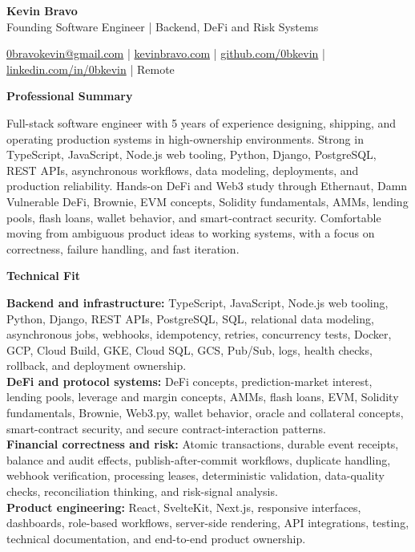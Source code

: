 \documentclass[10pt]{article}
\newcommand{\sectiontitle}[1]{%
    \vspace{3pt}
    \begin{center}
        \textbf{#1}
    \end{center}
    \vspace{-5pt}
}
\begin{document}
\raggedright

\begin{center}
    {\LARGE \textbf{Kevin Bravo}}\\
    Founding Software Engineer | Backend, DeFi and Risk Systems \\
    \hrulefill
\end{center}

\begin{center}
    \href{mailto:0bravokevin@gmail.com}{0bravokevin@gmail.com}
    | \href{https://kevinbravo.com}{kevinbravo.com}
    | \href{https://github.com/0bkevin}{github.com/0bkevin}
    | \href{https://www.linkedin.com/in/0bkevin/}{linkedin.com/in/0bkevin}
    | Remote
\end{center}

\fontsize{9.65}{10.55}\selectfont

\sectiontitle{Professional Summary}
Full-stack software engineer with 5 years of experience designing, shipping, and operating production systems in high-ownership environments. Strong in TypeScript, JavaScript, Node.js web tooling, Python, Django, PostgreSQL, REST APIs, asynchronous workflows, data modeling, deployments, and production reliability. Hands-on DeFi and Web3 study through Ethernaut, Damn Vulnerable DeFi, Brownie, EVM concepts, Solidity fundamentals, AMMs, lending pools, flash loans, wallet behavior, and smart-contract security. Comfortable moving from ambiguous product ideas to working systems, with a focus on correctness, failure handling, and fast iteration.

\sectiontitle{Technical Fit}
\textbf{Backend and infrastructure:} TypeScript, JavaScript, Node.js web tooling, Python, Django, REST APIs, PostgreSQL, SQL, relational data modeling, asynchronous jobs, webhooks, idempotency, retries, concurrency tests, Docker, GCP, Cloud Build, GKE, Cloud SQL, GCS, Pub/Sub, logs, health checks, rollback, and deployment ownership. \\
\textbf{DeFi and protocol systems:} DeFi concepts, prediction-market interest, lending pools, leverage and margin concepts, AMMs, flash loans, EVM, Solidity fundamentals, Brownie, Web3.py, wallet behavior, oracle and collateral concepts, smart-contract security, and secure contract-interaction patterns. \\
\textbf{Financial correctness and risk:} Atomic transactions, durable event receipts, balance and audit effects, publish-after-commit workflows, duplicate handling, webhook verification, processing leases, deterministic validation, data-quality checks, reconciliation thinking, and risk-signal analysis. \\
\textbf{Product engineering:} React, SvelteKit, Next.js, responsive interfaces, dashboards, role-based workflows, server-side rendering, API integrations, testing, technical documentation, and end-to-end product ownership.
\end{document}
